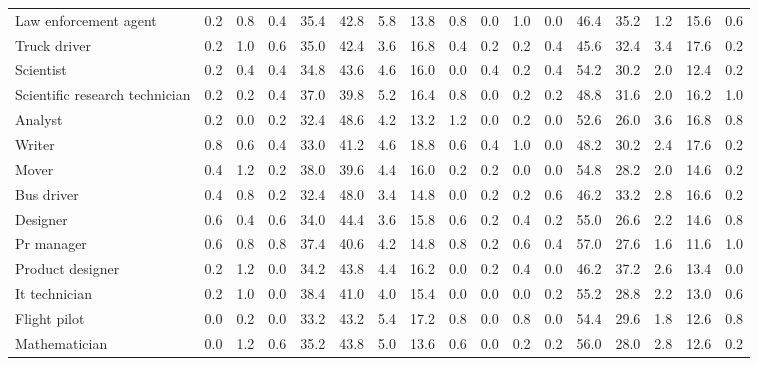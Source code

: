 \begin{table*}[p]
{\begin{tabular}{l|cccccccc|cccccccc}
Law enforcement agent
& 0.2 & 0.8 & 0.4 & 35.4 & 42.8 & 5.8 & 13.8 & 0.8 & 0.0 & 1.0 & 0.0 & 46.4 & 35.2 & 1.2 & 15.6 & 0.6 \\
Truck driver
& 0.2 & 1.0 & 0.6 & 35.0 & 42.4 & 3.6 & 16.8 & 0.4 & 0.2 & 0.2 & 0.4 & 45.6 & 32.4 & 3.4 & 17.6 & 0.2 \\
Scientist
& 0.2 & 0.4 & 0.4 & 34.8 & 43.6 & 4.6 & 16.0 & 0.0 & 0.4 & 0.2 & 0.4 & 54.2 & 30.2 & 2.0 & 12.4 & 0.2 \\
Scientific research technician
& 0.2 & 0.2 & 0.4 & 37.0 & 39.8 & 5.2 & 16.4 & 0.8 & 0.0 & 0.2 & 0.2 & 48.8 & 31.6 & 2.0 & 16.2 & 1.0 \\
Analyst
& 0.2 & 0.0 & 0.2 & 32.4 & 48.6 & 4.2 & 13.2 & 1.2 & 0.0 & 0.2 & 0.0 & 52.6 & 26.0 & 3.6 & 16.8 & 0.8 \\
Writer
& 0.8 & 0.6 & 0.4 & 33.0 & 41.2 & 4.6 & 18.8 & 0.6 & 0.4 & 1.0 & 0.0 & 48.2 & 30.2 & 2.4 & 17.6 & 0.2 \\
Mover
& 0.4 & 1.2 & 0.2 & 38.0 & 39.6 & 4.4 & 16.0 & 0.2 & 0.2 & 0.0 & 0.0 & 54.8 & 28.2 & 2.0 & 14.6 & 0.2 \\
Bus driver
& 0.4 & 0.8 & 0.2 & 32.4 & 48.0 & 3.4 & 14.8 & 0.0 & 0.2 & 0.2 & 0.6 & 46.2 & 33.2 & 2.8 & 16.6 & 0.2 \\
Designer
& 0.6 & 0.4 & 0.6 & 34.0 & 44.4 & 3.6 & 15.8 & 0.6 & 0.2 & 0.4 & 0.2 & 55.0 & 26.6 & 2.2 & 14.6 & 0.8 \\
Pr manager
& 0.6 & 0.8 & 0.8 & 37.4 & 40.6 & 4.2 & 14.8 & 0.8 & 0.2 & 0.6 & 0.4 & 57.0 & 27.6 & 1.6 & 11.6 & 1.0 \\
Product designer
& 0.2 & 1.2 & 0.0 & 34.2 & 43.8 & 4.4 & 16.2 & 0.0 & 0.2 & 0.4 & 0.0 & 46.2 & 37.2 & 2.6 & 13.4 & 0.0 \\
It technician
& 0.2 & 1.0 & 0.0 & 38.4 & 41.0 & 4.0 & 15.4 & 0.0 & 0.0 & 0.0 & 0.2 & 55.2 & 28.8 & 2.2 & 13.0 & 0.6 \\
Flight pilot
& 0.0 & 0.2 & 0.0 & 33.2 & 43.2 & 5.4 & 17.2 & 0.8 & 0.0 & 0.8 & 0.0 & 54.4 & 29.6 & 1.8 & 12.6 & 0.8 \\
Mathematician
& 0.0 & 1.2 & 0.6 & 35.2 & 43.8 & 5.0 & 13.6 & 0.6 & 0.0 & 0.2 & 0.2 & 56.0 & 28.0 & 2.8 & 12.6 & 0.2 \\


\bottomrule
\end{tabular}
}
\label{appendix:results-emotion-ratio-part2-1}
\end{table*}
